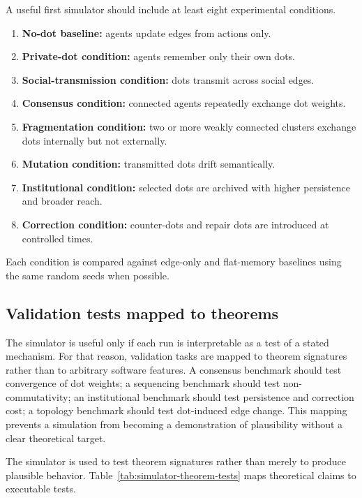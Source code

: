 \documentclass[11pt]{article}
\theoremstyle{remark}
\begin{document}
A useful first simulator should include at least eight experimental
conditions.

\begin{enumerate}[leftmargin=*]
\item \textbf{No-dot baseline:} agents update edges from actions only.
\item \textbf{Private-dot condition:} agents remember only their own dots.
\item \textbf{Social-transmission condition:} dots transmit across social
edges.
\item \textbf{Consensus condition:} connected agents repeatedly exchange
dot weights.
\item \textbf{Fragmentation condition:} two or more weakly connected
clusters exchange dots internally but not externally.
\item \textbf{Mutation condition:} transmitted dots drift semantically.
\item \textbf{Institutional condition:} selected dots are archived with
higher persistence and broader reach.
\item \textbf{Correction condition:} counter-dots and repair dots are
introduced at controlled times.
\end{enumerate}

Each condition is compared against edge-only and flat-memory baselines using the same random seeds when possible.

\subsection{Validation tests mapped to theorems}\label{validation-tests-mapped-to-theorems}

The simulator is useful only if each run is interpretable as a test of a stated mechanism. For that reason, validation tasks are mapped to theorem signatures rather than to arbitrary software features. A consensus benchmark should test convergence of dot weights; a sequencing benchmark should test non-commutativity; an institutional benchmark should test persistence and correction cost; a topology benchmark should test dot-induced edge change. This mapping prevents a simulation from becoming a demonstration of plausibility without a clear theoretical target.


The simulator is used to test theorem signatures rather than merely to produce plausible behavior. Table~\ref{tab:simulator-theorem-tests}
maps theoretical claims to executable tests.
\end{document}
